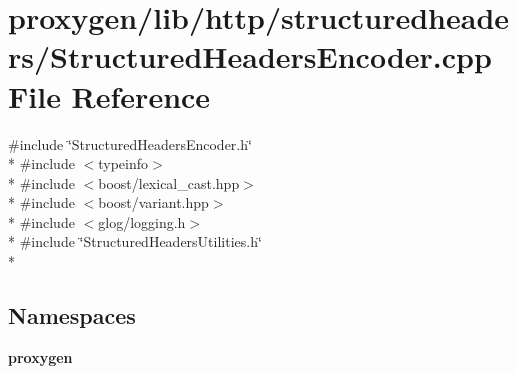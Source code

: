 \section{proxygen/lib/http/structuredheaders/\+Structured\+Headers\+Encoder.cpp File Reference}
\label{StructuredHeadersEncoder_8cpp}
{\ttfamily \#include \char`\"{}Structured\+Headers\+Encoder.\+h\char`\"{}}\\*
{\ttfamily \#include $<$typeinfo$>$}\\*
{\ttfamily \#include $<$boost/lexical\+\_\+cast.\+hpp$>$}\\*
{\ttfamily \#include $<$boost/variant.\+hpp$>$}\\*
{\ttfamily \#include $<$glog/logging.\+h$>$}\\*
{\ttfamily \#include \char`\"{}Structured\+Headers\+Utilities.\+h\char`\"{}}\\*
\subsection*{Namespaces}
\begin{DoxyCompactItemize}
\item 
 {\bf proxygen}
\end{DoxyCompactItemize}
